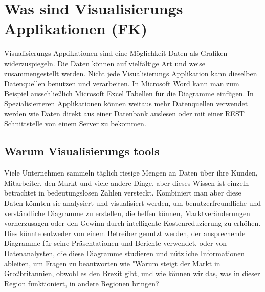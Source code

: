 \chapter{Was sind Visualisierungs Applikationen (FK)}
Visualisierungs Applikationen sind eine Möglichkeit Daten als Grafiken widerzuspiegeln. Die Daten können auf vielfältige Art und weise zusammengestellt werden. Nicht jede Visualisierungs Applikation kann dieselben Datenquellen benutzen und verarbeiten. In Microsoft Word kann man zum Beispiel ausschließlich Microsoft Excel Tabellen für die Diagramme einfügen. In Spezialisierteren Applikationen können weitaus mehr Datenquellen verwendet werden wie Daten direkt aus einer Datenbank auslesen oder mit einer REST Schnittstelle von einem Server zu bekommen.
\section{Warum Visualisierungs tools}
Viele Unternehmen sammeln täglich riesige Mengen an Daten über ihre Kunden, Mitarbeiter, den Markt und viele andere Dinge, aber dieses Wissen ist einzeln betrachtet in bedeutungslosen Zahlen versteckt. Kombiniert man aber diese Daten könnten sie analysiert und visualisiert werden, um benutzerfreundliche und verständliche Diagramme zu erstellen, die helfen können, Marktveränderungen vorherzusagen oder den Gewinn durch intelligente Kostenreduzierung zu erhöhen. 
Dies könnte entweder von einem Betreiber genutzt werden, der ansprechende Diagramme für seine Präsentationen und Berichte verwendet, oder von Datenanalysten, die diese Diagramme studieren und nützliche Informationen ableiten, um Fragen zu beantworten wie "Warum steigt der Markt in Großbritannien, obwohl es den Brexit gibt, und wie können wir das, was in dieser Region funktioniert, in andere Regionen bringen?
